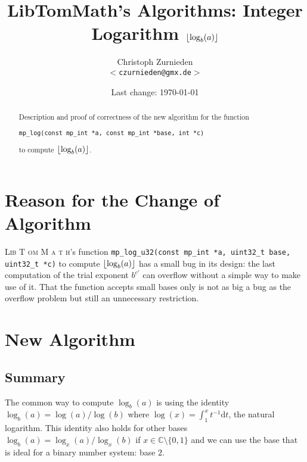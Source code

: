 \theoremstyle{remark}
\newtheorem*{rem}{Remark}
\newtheorem*{note}{Note}
\newtheorem{case}{Case}





\newcommand{\libtommath}{\textsc{Lib\kern -1pt T\kern -1.2pt om\kern -0.6pt M\kern -0.6pt a\kern -0.9pt t\kern -0.4pt h}}
\setcounter{secnumdepth}{3}
\setcounter{tocdepth}{3}


\title{LibTomMath's Algorithms: Integer Logarithm $\left\lfloor\log_b(a)\right\rfloor$}
\author{Christoph Zurnieden\\
        \small{\texttt{$<$czurnieden@gmx.de$>$}}}
\date{Last change: \today}
\maketitle


\begin{abstract}
Description and proof of correctness of the new algorithm for the function
\begin{center}
 \texttt{mp\_log(const mp\_int *a, const mp\_int *base, int *c)}
\end{center}
to compute $\left\lfloor\log_b(a)\right\rfloor$.
\end{abstract}

\section{Reason for the Change of Algorithm}
\libtommath's function \texttt{mp\_log\_u32(const mp\_int *a, uint32\_t base, uint32\_t *c)} to
compute $\left\lfloor\log_b(a)\right\rfloor$ has a small bug in its design: the last computation of the trial
exponent $b^{c'}$ can overflow without a simple way to make use of it. That the function accepts
small bases only is not as big a bug as the overflow problem but still an unnecessary restriction.

\section{New Algorithm}

\subsection{Summary}\label{sec:summary}
The common way to compute $\log_b(a)$ is using the identity $\log_b(a) = \log(a)/\log(b)$
where $\log(x) = \int_1^x t^{-1}\textrm{d}t$, the natural logarithm. This identity also holds
for other bases $\log_b(a) = \log_x(a) / \log_x(b)$ if $x \in \mathbb{C}\setminus\{0,1\}$ and
we can use the base that is ideal for a binary number system: base $2$.

